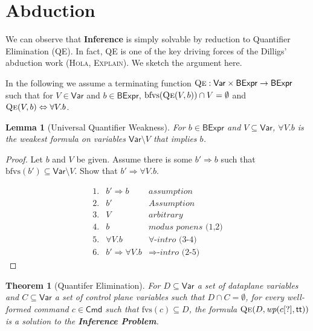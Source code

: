 \documentclass{article}
\newcommand{\TRUE}{\mathsf{tt}}
\newcommand{\BExpr}{\mathsf{BExpr}}
\newcommand{\Cmd}{\mathsf{Cmd}}
\newcommand{\Var}{\mathsf{Var}}
\newcommand{\WP}{\textit{wp}}
\newcommand{\instr}{[?]}
\newcommand{\qe}{\textsc{Qe}}
\newcommand{\fvs}{\textrm{fvs}}
\newcommand{\bfvs}{\textrm{bfvs}}
\theoremstyle{plain}
\newtheorem{theorem}{Theorem}
\newtheorem{lemma}{Lemma}
\theoremstyle{definition}
\theoremstyle{remark}
\begin{document}
\section{Abduction}

We can observe that \textbf{Inference} is simply solvable by reduction to
Quantifier Elimination (QE). In fact, QE is one of the key driving forces of the
Dilligs' abduction work (\textsc{Hola}, \textsc{Explain}). We sketch the
argument here.

In the following we assume a terminating function $\qe : \Var \times \BExpr \to
\BExpr$ such that for $V \in \Var$ and $b \in \BExpr$, $\bfvs(\qe(V,b)) \cap V =
\emptyset$ and $\qe(V,b) \Leftrightarrow \forall V. b$.

\begin{lemma}[Universal Quantifier Weakness]
  \label{lem:quantified-weakest}
  For $b \in \BExpr$ and $V \subseteq \Var$, $\forall V. b$ is the weakest
  formula on variables $\Var \setminus V$ that implies $b$.
\end{lemma}
\begin{proof}
  Let $b$ and $V$ be given. Assume there is some $b' \Rightarrow b$ such that
  $\bfvs(b') \subseteq \Var \setminus V$. Show that $b' \Rightarrow \forall
  V.b$.

  \[\begin{array}{rll}
   1. & b' \Rightarrow b & \textit{assumption} \\
   2. & b' & \textit{Assumption} \\
   3. & V & \textit{arbitrary} \\
   4. & b & \textit{modus ponens (1,2)} \\
   5. & \forall V.b & \forall\textit{-intro (3-4)}\\
   6. & b' \Rightarrow \forall V. b & \Rightarrow\textit{-intro (2-5)}
  \end{array}\]


\end{proof}

\begin{theorem}[Quantifer Elimination]
  For $D \subseteq \Var$ a set of dataplane variables and $C \subseteq \Var$ a
  set of control plane variables such that $D \cap C = \emptyset$, for every well-formed
  command $c \in \Cmd$ such that $\fvs(c) \subseteq D$, the formula $\qe(D,
  \WP(c\instr, \TRUE))$ is a solution to the \textbf{Inference Problem}.
\end{theorem}
\end{document}
